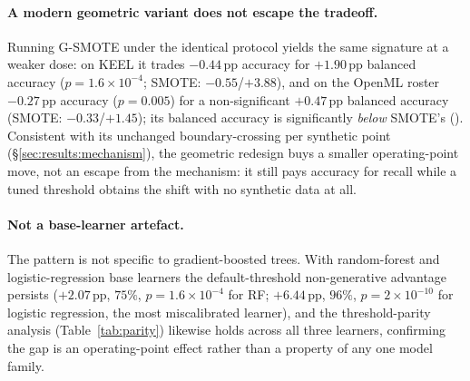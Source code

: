 \paragraph{A modern geometric variant does not escape the tradeoff.} Running
G-SMOTE \cite{douzas2019geometric} under the identical protocol yields the
same signature at a weaker dose: on KEEL it trades $-0.44$\,pp accuracy for
$+1.90$\,pp balanced accuracy ($p=1.6\times10^{-4}$; SMOTE: $-0.55$/$+3.88$),
and on the OpenML roster $-0.27$\,pp accuracy ($p=0.005$) for a
non-significant $+0.47$\,pp balanced accuracy (SMOTE: $-0.33$/$+1.45$); its
balanced accuracy is significantly \emph{below} SMOTE's
(). Consistent with its unchanged boundary-crossing
per synthetic point (\S\ref{sec:results:mechanism}), the geometric redesign
buys a smaller operating-point move, not an escape from the mechanism: it
still pays accuracy for recall while a tuned threshold obtains the shift with
no synthetic data at all.

\begin{table}[t]
\centering
\caption{The default-threshold non-generative advantage and the SMOTE tradeoff by
data stratum (existing benchmark cells, no re-run), all at the \emph{default}
threshold. NG$\ge$G is the fraction of datasets where the best non-generative
strategy matches/beats the best generative one on balanced accuracy; ``bacc adv.''
is the mean per-dataset advantage; the last two columns are SMOTE's mean accuracy
and balanced-accuracy change vs.\ the do-nothing baseline (percentage points). The
gap grows with imbalance but is an operating-point effect (Table~\ref{tab:parity}).}
\label{tab:irstrata}

\end{table}

\paragraph{Not a base-learner artefact.} The pattern is not specific to
gradient-boosted trees. With random-forest and logistic-regression base learners
the default-threshold non-generative advantage persists ($+2.07$\,pp, $75\%$,
$p=1.6\times10^{-4}$ for RF; $+6.44$\,pp, $96\%$, $p=2\times10^{-10}$ for logistic
regression, the most miscalibrated learner), and the threshold-parity analysis
(Table~\ref{tab:parity}) likewise holds across all three learners, confirming the
gap is an operating-point effect rather than a property of any one model family.



